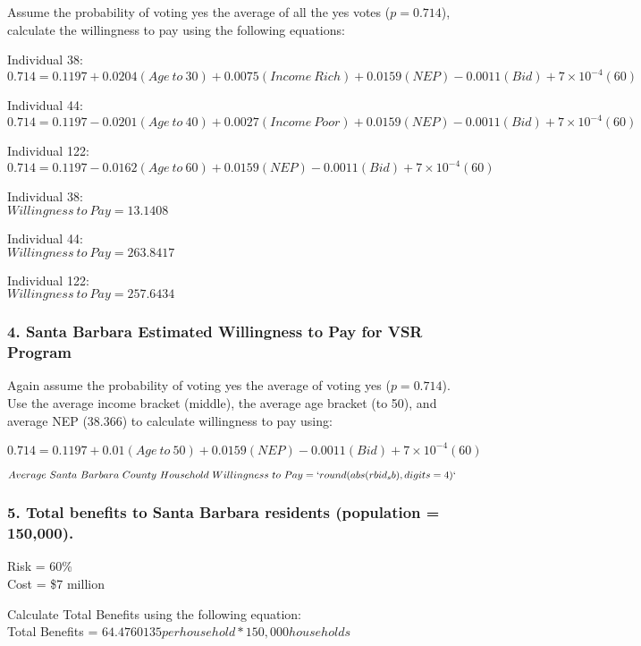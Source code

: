 \documentclass[]{article}
\begin{document}
Assume the probability of voting yes the average of all the yes votes
(\(p = 0.714\)), calculate the willingness to pay using the following
equations:

Individual 38:\\
\(0.714 = 0.1197 + 0.0204(Age~to~30) + 0.0075(Income~Rich) + 0.0159(NEP) - 0.0011(Bid) + 7\times 10^{-4}(60)\)

Individual 44:\\
\(0.714 = 0.1197 - 0.0201(Age~to~40) + 0.0027(Income~Poor) + 0.0159(NEP) - 0.0011(Bid) + 7\times 10^{-4}(60)\)

Individual 122:\\
\(0.714 = 0.1197- 0.0162(Age~to~60) + 0.0159(NEP) - 0.0011(Bid)+ 7\times 10^{-4}(60)\)

Individual 38:\\
\(Willingness~to~Pay = 13.1408\)

Individual 44:\\
\(Willingness~to~Pay = 263.8417\)

Individual 122:\\
\(Willingness~to~Pay = 257.6434\)

\subsubsection{4. Santa Barbara Estimated Willingness to Pay for VSR
Program}\label{santa-barbara-estimated-willingness-to-pay-for-vsr-program}

Again assume the probability of voting yes the average of voting yes
(\(p = 0.714\)). Use the average income bracket (middle), the average
age bracket (to 50), and average NEP (38.366) to calculate willingness
to pay using:

\(0.714 = 0.1197 + 0.01(Age~to~50) + 0.0159(NEP) - 0.0011(Bid) + 7\times 10^{-4}(60)\)

\(Average~Santa~Barbara~County~Household~Willingness~to~Pay = `round(abs(r bid_sb), digits=4)`\)

\subsubsection{5. Total benefits to Santa Barbara residents (population
=
150,000).}\label{total-benefits-to-santa-barbara-residents-population-150000.}

Risk = 60\%\\
Cost = \$7 million

Calculate Total Benefits using the following equation:\\
Total Benefits = \(64.4760135per household * 150,000 households\)
\end{document}
